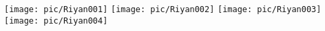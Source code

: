 \documentclass[10pt,a4paper]{article}
\begin{document}
\texttt{[image: pic/Riyan001]}
\texttt{[image: pic/Riyan002]}
\texttt{[image: pic/Riyan003]}
\texttt{[image: pic/Riyan004]}
\end{document}
